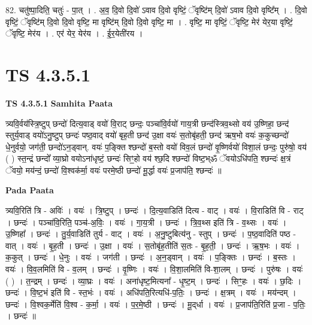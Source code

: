 \documentclass[17pt]{extarticle}
\begin{document}
82. चतु॑ष्पा॒दिति॒ चतुः॑ - पा॒त् । . अ॒व॒ दि॒वो दि॒वो॑ ऽवाव दि॒वो वृष्टिं॒ ॅवृष्टि॑म् दि॒वो॑ ऽवाव दि॒वो वृष्टि᳚म् । . दि॒वो वृष्टिं॒ ॅवृष्टि॑म् दि॒वो दि॒वो वृष्टि॒ मा वृष्टि॑म् दि॒वो दि॒वो वृष्टि॒ मा । . वृष्टि॒ मा वृष्टिं॒ ॅवृष्टि॒ मेर॑ येर॒या वृष्टिं॒ ॅवृष्टि॒ मेर॑य । . एर॑ येर॒ येर॑य । . ई॒र॒येती॑रय । \newline
\pagebreak
{}

\section{ TS 4.3.5.1 }

\textbf{TS 4.3.5.1 } \newline
\textbf{Samhita Paata} \newline

त्र्यवि॒र्वय॑स्त्रि॒ष्टुप् छन्दो॑ दित्य॒वाड् वयो॑ वि॒राट् छन्दः॒ पञ्चा॑वि॒र्वयो॑ गाय॒त्री छन्द॑स्त्रिव॒थ्सो वय॑ उ॒ष्णिहा॒ छन्द॑ स्तुर्य॒वाड् वयो॑ऽनु॒ष्टुप् छन्दः॑ पष्ठ॒वाद् वयो॑ बृह॒ती छन्द॑ उ॒क्षा वयः॑ स॒तोबृ॑हती॒ छन्द॑ ऋष॒भो वयः॑ क॒कुच्छन्दो॑ धे॒नुर्वयो॒ जग॑ती॒ छन्दो॑ऽन॒ड्वान्. वयः॑ प॒ङ्क्ति श्छन्दो॑ ब॒स्तो वयो॑ विव॒लं छन्दो॑ वृ॒ष्णिर्वयो॑ विशा॒लं छन्दः॒ पुरु॑षो॒ वय॑ ( ) स्त॒न्द्रं छन्दो᳚ व्या॒घ्रो वयोऽना॑धृष्टं॒ छन्दः॑ सिꣳ॒॒हो वय॑ श्छ॒दि श्छन्दो॑ विष्ट॒भ्ॐ ॅवयोऽधि॑पति॒ श्छन्दः॑ क्ष॒त्रं ॅवयो॒ मय॑न्दं॒ छन्दो॑ वि॒श्वक॑र्मा॒ वयः॑ परमे॒ष्ठी छन्दो॑ मू॒र्द्धा वयः॑ प्र॒जाप॑ति॒ श्छन्दः॑ ॥ \newline

\textbf{Pada Paata} \newline

त्र्यवि॒रिति॑ त्रि - अविः॑ । वयः॑ । त्रि॒ष्टुप् । छन्दः॑ । दि॒त्य॒वाडिति॑ दित्य - वाट् । वयः॑ । वि॒राडिति॑ वि - राट् । छन्दः॑ । पञ्चा॑वि॒रिति॒ पञ्च॑-अ॒विः॒ । वयः॑ । गा॒य॒त्री । छन्दः॑ । त्रि॒व॒थ्स इति॑ त्रि - व॒थ्सः । वयः॑ । उ॒ष्णिहा᳚ । छन्दः॑ । तु॒र्य॒वाडिति॑ तुर्य - वाट् । वयः॑ । अ॒नु॒ष्टुबित्य॑नु - स्तुप् । छन्दः॑ । प॒ष्ठ॒वादिति॑ पष्ठ - वात् । वयः॑ । बृ॒ह॒ती । छन्दः॑ । उ॒क्षा । वयः॑ । स॒तोबृ॑ह॒तीति॑ स॒तः - बृ॒ह॒ती॒ । छन्दः॑ । ऋ॒ष॒भः । वयः॑ । क॒कुत् । छन्दः॑ । धे॒नुः । वयः॑ । जग॑ती । छन्दः॑ । अ॒न॒ड्वान् । वयः॑ । प॒ङ्क्तिः । छन्दः॑ । ब॒स्तः । वयः॑ । वि॒व॒लमिति॑ वि - व॒लम् । छन्दः॑ । वृ॒ष्णिः । वयः॑ । वि॒शा॒लमिति॑ वि-शा॒लम् । छन्दः॑ । पुरु॑षः । वयः॑ ( ) । त॒न्द्रम् । छन्दः॑ । व्या॒घ्रः । वयः॑ । अना॑धृष्ट॒मित्यना᳚ - धृ॒ष्ट॒म् । छन्दः॑ । सिꣳ॒॒हः । वयः॑ । छ॒दिः । छन्दः॑ । वि॒ष्ट॒भं इति॑ वि - स्त॒भंः । वयः॑ । अधि॑पति॒रित्यधि॑-प॒तिः॒ । छन्दः॑ । क्ष॒त्रम् । वयः॑ । मय॑न्दम् । छन्दः॑ । वि॒श्वक॒र्मेति॑ वि॒श्व - क॒र्मा॒ । वयः॑ । प॒र॒मे॒ष्ठी । छन्दः॑ । मू॒द्‌र्धा । वयः॑ । प्र॒जाप॑ति॒रिति॑ प्र॒जा - प॒तिः॒ । छन्दः॑ ॥  \newline
\end{document}
